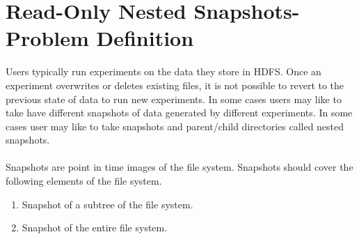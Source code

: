 
%
%
%


\chapter{Read-Only Nested Snapshots-Problem Definition}
\label{ch:RONSProblem}

Users typically run experiments on the data they store in HDFS. Once an experiment overwrites or deletes existing files, it is not possible to revert to the previous state of data to run new experiments. In some cases users may like to take have different snapshots of data generated by different experiments. In some cases user may like to take snapshots and parent/child directories called nested snapshots.\\\\
Snapshots are point in time images of the file system. Snapshots should cover the following elements of the file system.
\begin{enumerate}
\item Snapshot of a subtree of the file system.
\item Snapshot of the entire file system.
\end{enumerate}

